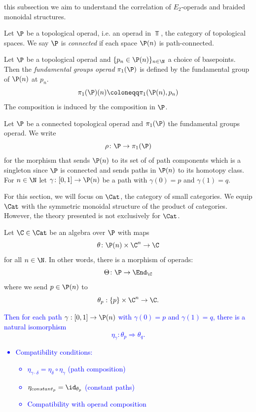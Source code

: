 \In this subsection we aim to understand the correlation of $E_2$-operads and braided monoidal structures.


\begin{defin}
Let $\P$ be a topological operad, i.e. an operad in $\Top$, the category of topological spaces. We say $\P$ is \emph{connected} if each space $\P(n)$ is path-connected.
\end{defin}

\begin{defin}
Let $\P$ be a topological operad and $\{p_n \in \P(n)\}_{n \in \N}$ a choice of basepoints. Then the \emph{fundamental groups operad} $\pi_1(\P)$ is defined by the fundamental group of $\P(n)$ at $p_n$.
\[
    \pi_1(\P)(n) \coloneqq \pi_1(\P(n), p_n)
\]
The composition is induced by the composition in $\P$.
\end{defin}

Let $\P$ be a connected topological operad and $\pi_1(\P)$ the fundamental groups operad. We write
\[
    \rho \colon \P \to \pi_1(\P)
\]
for the morphism that sends $\P(n)$ to its set of of path components which is a singleton since $\P$ is connected and sends paths in $\P(n)$ to its homotopy class.
For $n \in \N$ let $\gamma \colon [0,1] \to \P(n)$ be a path with $\gamma(0)=p$ and $\gamma(1)=q$. 

For this section, we will focus on $\Cat$, the category of small categories. We equip $\Cat$ with the symmetric monoidal structure of the product of categories. However, the theory presented is not exclusively for $\Cat$.

Let $\C \in \Cat$ be an algebra over $\P$ with maps
\[
    \theta \colon \P(n) \times \C^n \to \C
\]
for all $n \in \N$. In other words, there is a morphism of operads:
\[
    \Theta \colon \P \to \End_{\C}
\]
where we send $p \in \P(n)$ to 
\[
    \theta_p: \{p\} \times \C^n \to \C.
\]





\textcolor{blue}{Then for each path $\gamma: [0,1] \to \P(n)$ with $\gamma(0) = p$ and $\gamma(1) = q$, there is a natural isomorphism 
\[
    \eta_\gamma \colon \theta_p \Rightarrow \theta_q.
\]
\begin{itemize}
    \item Compatibility conditions:
    \begin{itemize}
        \item $\eta_{\gamma \cdot \delta} = \eta_\delta \circ \eta_\gamma$ (path composition)
        \item $\eta_{constant_p} = \id_{\theta_p}$ (constant paths)
        \item Compatibility with operad composition
    \end{itemize}
\end{itemize}}

